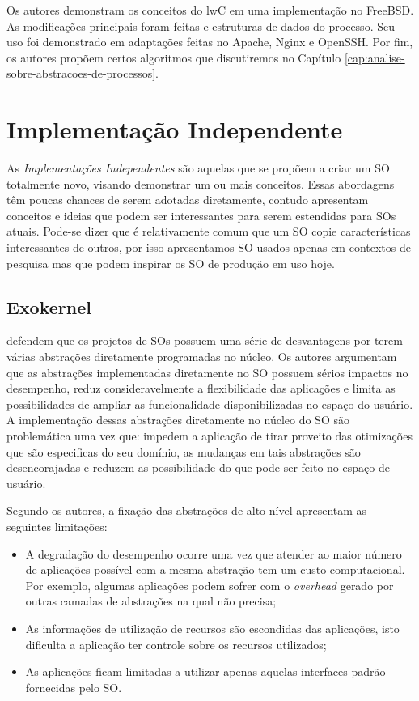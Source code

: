 Os autores demonstram os conceitos do lwC em uma implementação no FreeBSD. As
modificações principais foram feitas  e estruturas de dados do
processo. Seu uso foi demonstrado em adaptações feitas no Apache, Nginx e
OpenSSH. Por fim, os autores propõem certos algoritmos que discutiremos no
Capítulo \ref{cap:analise-sobre-abstracoes-de-processos}.

\section{Implementação Independente}

As \textit{Implementações Independentes} são aquelas que se propõem a criar um
SO totalmente novo, visando demonstrar um ou mais conceitos. Essas abordagens têm
poucas chances de serem adotadas diretamente, contudo apresentam conceitos e ideias que
podem ser interessantes para serem estendidas para SOs atuais. Pode-se dizer
que é relativamente comum que um SO copie características interessantes de
outros, por isso apresentamos  SO usados apenas em contextos de pesquisa
mas que podem inspirar os SO de produção em uso hoje.

\subsection{Exokernel}

\citet{exokernel} defendem que os projetos de SOs possuem uma série de
desvantagens por terem várias abstrações diretamente programadas no núcleo. Os
autores argumentam que as abstrações implementadas diretamente no SO possuem
sérios impactos no desempenho, reduz consideravelmente a flexibilidade das
aplicações e limita as possibilidades de ampliar as funcionalidade
disponibilizadas no espaço do usuário. A implementação dessas abstrações
diretamente no núcleo do SO são problemática uma vez que: impedem a aplicação
de tirar proveito das otimizações que são especificas do seu domínio, as
mudanças em tais abstrações são desencorajadas e reduzem as possibilidade do
que pode ser feito no espaço de usuário.

Segundo os autores, a fixação das abstrações de alto-nível apresentam as
seguintes limitações:

\begin{itemize}
  \item A degradação do desempenho ocorre uma vez que atender ao maior número
        de aplicações possível com a mesma abstração tem um custo
        computacional. Por exemplo, algumas aplicações podem sofrer com o
        \emph{overhead} gerado por outras camadas de abstrações na qual não
        precisa;
  \item As informações de utilização de recursos são escondidas das aplicações,
        isto dificulta a aplicação ter controle sobre os recursos utilizados;
  \item As aplicações ficam limitadas a utilizar apenas aquelas interfaces
        padrão fornecidas pelo SO.
\end{itemize}

